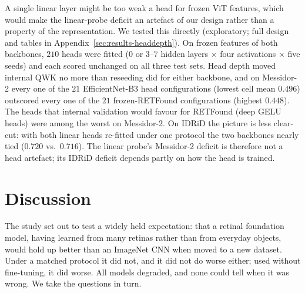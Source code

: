\documentclass[journal]{IEEEtran}
\renewcommand{\_}{\origunderscore\allowbreak}
\begin{document}
A single linear layer might be too weak a head for frozen ViT features, which
would make the linear-probe deficit an artefact of our design rather than a
property of the representation. We tested this directly (exploratory; full
design and tables in Appendix~\ref{sec:results-headdepth}). On frozen features of
both backbones, $210$ heads were fitted ($0$ or $3$--$7$ hidden layers $\times$ four
activations $\times$ five seeds) and each scored unchanged on all three test sets.
Head depth moved internal QWK no more than reseeding did for either backbone, and
on Messidor-2 every one of the $21$ EfficientNet-B3 head configurations
(lowest cell mean $0.496$) outscored every one of the $21$ frozen-RETFound
configurations (highest $0.448$). The heads that internal validation would
favour for RETFound (deep GELU heads) were among the worst on Messidor-2. On
IDRiD the picture is less clear-cut: with both linear heads re-fitted under one
protocol the two backbones nearly tied ($0.720$ vs.\ $0.716$). The linear probe's
Messidor-2 deficit is therefore not a head artefact; its IDRiD deficit depends
partly on how the head is trained.

\section{Discussion}
\label{sec:discussion}

The study set out to test a widely held expectation: that a retinal foundation
model, having learned from many retinas rather than from everyday objects,
would hold up better than an ImageNet CNN when moved to a new dataset. Under a
matched protocol it did not, and it did not do worse either; used without
fine-tuning, it did worse. All models degraded, and none could tell when it was
wrong. We take the questions in turn.
\end{document}
